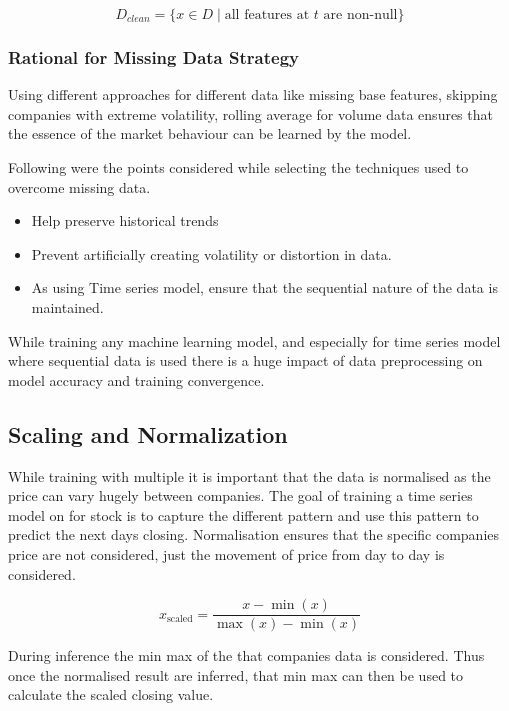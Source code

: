 \begin{equation}
D_{clean} = \{x \in D \mid \text{all features at } t \text{ are non-null}\}
\end{equation}

\subsubsection{Rational for Missing Data Strategy}

Using different approaches for different data like missing base features, skipping companies with extreme volatility, rolling average for volume data ensures that the essence of the market behaviour can be learned by the model.

Following were the points considered while selecting the techniques used to overcome missing data.

\begin{itemize}
    \item Help preserve historical trends
    \item Prevent artificially creating volatility or distortion in data.
    \item As using Time series model, ensure that the sequential nature of the data is maintained.
\end{itemize}

While training any machine learning model, and especially for time series model where sequential data is used there is a huge impact of data preprocessing on model accuracy and training convergence.

\subsection{Scaling and Normalization}

While training with multiple it is important that the data is normalised as the price can vary hugely between companies. The goal of training a time series model on for stock is to capture the  different pattern and use this pattern to predict the next days closing. Normalisation ensures that the specific companies price are not considered, just the movement of price from day to day is considered.

\begin{equation}
x_{\text{scaled}} = \frac{x - \min(x)}{\max(x) - \min(x)}
\end{equation}

During inference the min max of the that companies data is considered. Thus once the normalised result are inferred, that min max can then be used to calculate the scaled closing value.

